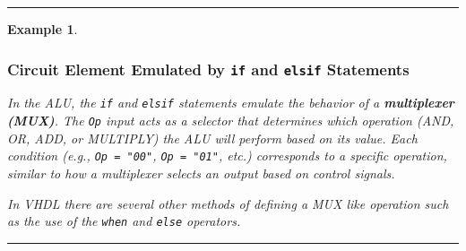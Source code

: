 \documentclass[12pt]{article}
\newtheorem{example}{Example}
\newenvironment{examp}
{
	\vspace{.5cm}
	\hrule
\begin{example}\upshape}
	{\hrule
		\vspace{0.5cm}
\end{example}}
\begin{document}
\begin{examp}

	\subsubsection*{Circuit Element Emulated by \texttt{if} and \texttt{elsif} Statements}
	In the ALU, the \texttt{if} and \texttt{elsif} statements emulate the behavior of a \textbf{multiplexer (MUX)}. The \texttt{Op} input acts as a selector that determines which operation (AND, OR, ADD, or MULTIPLY) the ALU will perform based on its value. Each condition (e.g., \texttt{Op = "00"}, \texttt{Op = "01"}, etc.) corresponds to a specific operation, similar to how a multiplexer selects an output based on control signals.

	In VHDL there are several other methods of defining a MUX like operation such
	as the use of the \texttt{when} and \texttt{else} operators.
\end{examp}
\end{document}
